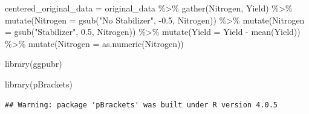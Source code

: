 \documentclass[
]{book}
\newenvironment{Shaded}{\begin{snugshade}}{\end{snugshade}}
\newcommand{\AttributeTok}[1]{\textcolor[rgb]{0.77,0.63,0.00}{#1}}
\newcommand{\FloatTok}[1]{\textcolor[rgb]{0.00,0.00,0.81}{#1}}
\newcommand{\FunctionTok}[1]{\textcolor[rgb]{0.00,0.00,0.00}{#1}}
\newcommand{\NormalTok}[1]{#1}
\newcommand{\OtherTok}[1]{\textcolor[rgb]{0.56,0.35,0.01}{#1}}
\newcommand{\SpecialCharTok}[1]{\textcolor[rgb]{0.00,0.00,0.00}{#1}}
\newcommand{\StringTok}[1]{\textcolor[rgb]{0.31,0.60,0.02}{#1}}
\begin{document}
\begin{Shaded}
\begin{Highlighting}[]
\NormalTok{centered\_original\_data }\OtherTok{=}\NormalTok{ original\_data }\SpecialCharTok{\%\textgreater{}\%}
  \FunctionTok{gather}\NormalTok{(Nitrogen, Yield) }\SpecialCharTok{\%\textgreater{}\%}
  \FunctionTok{mutate}\NormalTok{(}\AttributeTok{Nitrogen =} \FunctionTok{gsub}\NormalTok{(}\StringTok{"No Stabilizer"}\NormalTok{, }\SpecialCharTok{{-}}\FloatTok{0.5}\NormalTok{, Nitrogen)) }\SpecialCharTok{\%\textgreater{}\%}
  \FunctionTok{mutate}\NormalTok{(}\AttributeTok{Nitrogen =} \FunctionTok{gsub}\NormalTok{(}\StringTok{"Stabilizer"}\NormalTok{, }\FloatTok{0.5}\NormalTok{, Nitrogen)) }\SpecialCharTok{\%\textgreater{}\%}
  \FunctionTok{mutate}\NormalTok{(}\AttributeTok{Yield =}\NormalTok{ Yield }\SpecialCharTok{{-}} \FunctionTok{mean}\NormalTok{(Yield)) }\SpecialCharTok{\%\textgreater{}\%}
  \FunctionTok{mutate}\NormalTok{(}\AttributeTok{Nitrogen =} \FunctionTok{as.numeric}\NormalTok{(Nitrogen))}

\FunctionTok{library}\NormalTok{(ggpubr)}


\FunctionTok{library}\NormalTok{(pBrackets)}
\end{Highlighting}
\end{Shaded}

\begin{verbatim}
## Warning: package 'pBrackets' was built under R version 4.0.5
\end{verbatim}
\end{document}
